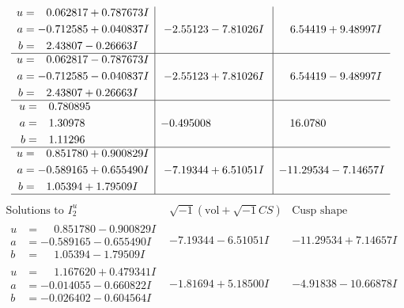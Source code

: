 \documentclass[1p]{elsarticle_modified}
\theoremstyle{definition}
\newcommand{\I}{\sqrt{-1}}
\begin{document}
$$\begin{array}{c|c|c}
\begin{aligned}
u &= \phantom{-}0.062817 + 0.787673 I \\
a &= -0.712585 + 0.040837 I \\
b &= \phantom{-}2.43807 - 0.26663 I\end{aligned}
 & -2.55123 - 7.81026 I & \phantom{-}6.54419 + 9.48997 I \\ \hline\begin{aligned}
u &= \phantom{-}0.062817 - 0.787673 I \\
a &= -0.712585 - 0.040837 I \\
b &= \phantom{-}2.43807 + 0.26663 I\end{aligned}
 & -2.55123 + 7.81026 I & \phantom{-}6.54419 - 9.48997 I \\ \hline\begin{aligned}
u &= \phantom{-}0.780895\phantom{ +0.000000I} \\
a &= \phantom{-}1.30978\phantom{ +0.000000I} \\
b &= \phantom{-}1.11296\phantom{ +0.000000I}\end{aligned}
 & -0.495008\phantom{ +0.000000I} & \phantom{-}16.0780\phantom{ +0.000000I} \\ \hline\begin{aligned}
u &= \phantom{-}0.851780 + 0.900829 I \\
a &= -0.589165 + 0.655490 I \\
b &= \phantom{-}1.05394 + 1.79509 I\end{aligned}
 & -7.19344 + 6.51051 I & -11.29534 - 7.14657 I\\
 \hline 
 \end{array}$$\newpage$$\begin{array}{c|c|c}  
\text{Solutions to }I^u_{2}& \I (\text{vol} + \sqrt{-1}CS) & \text{Cusp shape}\\
 \hline 
\begin{aligned}
u &= \phantom{-}0.851780 - 0.900829 I \\
a &= -0.589165 - 0.655490 I \\
b &= \phantom{-}1.05394 - 1.79509 I\end{aligned}
 & -7.19344 - 6.51051 I & -11.29534 + 7.14657 I \\ \hline\begin{aligned}
u &= \phantom{-}1.167620 + 0.479341 I \\
a &= -0.014055 - 0.660822 I \\
b &= -0.026402 - 0.604564 I\end{aligned}
 & -1.81694 + 5.18500 I & -4.91838 - 10.66878 I \\ \hline\begin{aligned}

\end{aligned}
\end{array}$$
\end{document}
